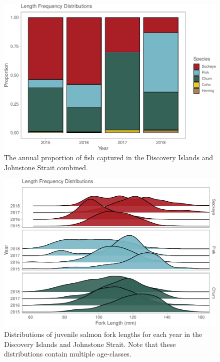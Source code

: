 \documentclass[fleqn,10pt]{wlpeerj} %
\begin{document}
\begin{figure}[H]
\includegraphics[width=0.9\linewidth]{Migration_Observations_Report_files/figure-latex/proportion-plot-1} \caption{The annual proportion of fish captured in the Discovery Islands and Johnstone Strait combined.}\label{fig:proportion-plot}
\end{figure}

\begin{figure}[H]
\includegraphics[width=0.9\linewidth]{Migration_Observations_Report_files/figure-latex/length-plot-1} \caption{Distributions of juvenile salmon fork lengths for each year in the Discovery Islands and Johnstone Strait. Note that these distributions contain multiple age-classes.}\label{fig:length-plot}
\end{figure}
\end{document}
